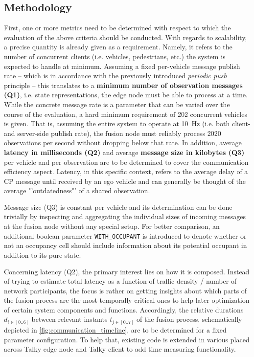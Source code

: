 \subsection{Methodology}
\label{subsec:evaluation:performance_evaluation:methodology}
First, one or more metrics need to be determined with respect to which the evaluation of the above criteria should be conducted. With regards to scalability, a precise quantity is already given as a requirement. Namely, it refers to the number of concurrent clients (i.e. vehicles, pedestrians, etc.) the system is expected to handle at minimum. Assuming a fixed per-vehicle message publish rate – which is in accordance with the previously introduced \textit{periodic push} principle – this translates to a \textbf{minimum number of observation messages (Q1)}, i.e. state representations, the edge node must be able to process at a time. While the concrete message rate is a parameter that can be varied over the course of the evaluation, a hard minimum requirement of 202 concurrent vehicles is given. That is, assuming the entire system to operate at \SI{10}{Hz} (i.e. both client- and server-side publish rate), the fusion node must reliably process 2020 observations per second without dropping below that rate. In addition, average \textbf{latency in milliseconds (Q2)} and average \textbf{message size in kilobytes (Q3)} per vehicle and per observation are to be determined to cover the communication efficiency aspect. Latency, in this specific context, refers to the average delay of a CP message until received by an ego vehicle and can generally be thought of the average "'outdatedness"' of a shared observation.
\par
\bigskip

Message size (Q3) is constant per vehicle and its determination can be done trivially by inspecting and aggregating the individual sizes of incoming messages at the fusion node without any special setup. For better comparison, an additional boolean parameter \texttt{WITH\_OCCUPANT} is introduced to denote whether or not an occupancy cell should include information about its potential occupant in addition to its pure state.
\par
\bigskip

Concerning latency (Q2), the primary interest lies on how it is composed. Instead of trying to estimate total latency as a function of traffic density / number of network participants, the focus is rather on getting insights about which parts of the fusion process are the most temporally critical ones to help later optimization of certain system components and functions. Accordingly, the relative durations $d_{i \in [0..6]}$ between relevant instants $t_{j \in [0..7]}$ of the fusion process, schematically depicted in \cref{fig:communication_timeline}, are to be determined for a fixed parameter configuration. To help that, existing code is extended in various placed across Talky edge node and Talky client to add time measuring functionality.
\par
\bigskip

